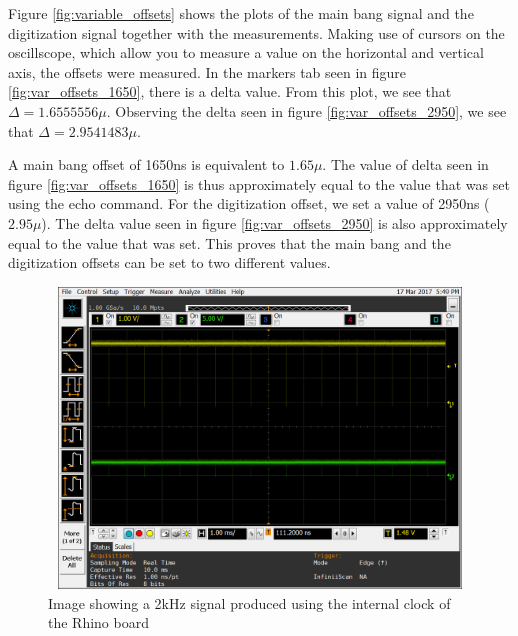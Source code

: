 \documentclass[12pt, a4paper]{article}
\begin{document}
\clearpage
	
Figure \ref{fig:variable_offsets} shows the plots of the main bang signal and the digitization signal together with the measurements. Making use of cursors on the oscillscope, which allow you to measure a value on the horizontal and vertical axis, the offsets were measured. In the markers tab seen in figure \ref{fig:var_offsets_1650}, there is a delta value. From this plot, we see that \( \Delta = 1.6555556 \mu \). Observing the delta seen in figure \ref{fig:var_offsets_2950}, we see that \( \Delta = 2.9541483 \mu \). 


A main bang offset of 1650ns is equivalent to \( 1.65 \mu \). The value of delta seen in figure \ref{fig:var_offsets_1650} is thus approximately equal to the value that was set using the echo command. For the digitization offset, we set a value of 2950ns (\( 2.95 \mu \)). The delta value seen in figure \ref{fig:var_offsets_2950} is also approximately equal to the value that was set. This proves that the main bang and the digitization offsets can be set to two different values. 


	\begin{figure}[t]
		\centering
		\includegraphics[width=13cm, height=8cm]{2khz_mb_offset_500_ns}
		\caption{Image showing a 2kHz signal produced using the internal clock of the Rhino board}
		\label{fig:2kHz_sig_int}
	\end{figure}
	
\end{document}
